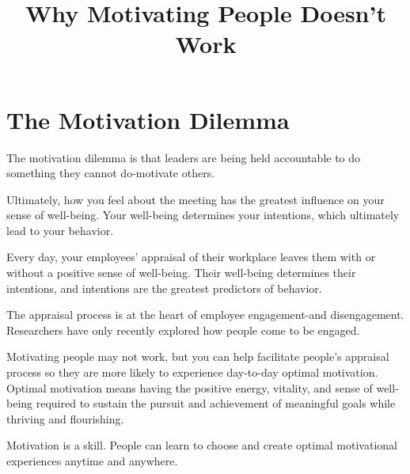 \documentclass[ebook,12pt,oneside,openany]{memoir}
\begin{document}
\title{Why Motivating People Doesn't Work}
\maketitle

\section{The Motivation Dilemma}
The motivation dilemma is that leaders are being held accountable to do something
they cannot do-motivate others.

Ultimately, how you feel about the meeting has the greatest influence on your sense of 
well-being. Your well-being determines your intentions, which ultimately lead to your behavior.

Every day, your employees' appraisal of their workplace leaves them with or without a positive sense of well-being.
Their well-being determines their intentions, and intentions are the greatest predictors of behavior.

The appraisal process is at the heart of employee engagement-and disengagement.
Researchers have only recently explored how people come to be engaged.

Motivating people may not work, but you can help facilitate people's appraisal process so they are more likely to experience
day-to-day optimal motivation.
Optimal motivation means having the positive energy, vitality, and sense of well-being required to sustain the pursuit and achievement of meaningful goals 
while thriving and flourishing.

Motivation is a skill. People can learn to choose and create optimal motivational experiences anytime and anywhere.
\end{document}

